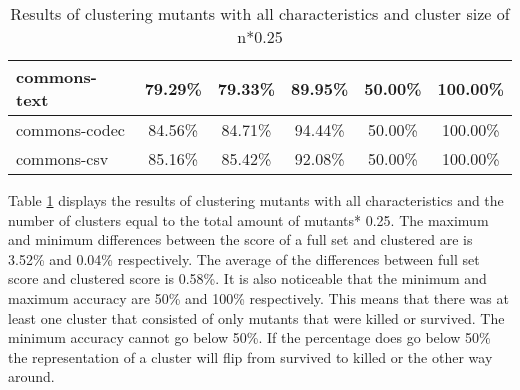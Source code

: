 \documentclass[../../main]{subfiles}
\begin{document}
\begin{table}[!htb]
\begin{tabular}{|l|c|c|c|c|c|}
commons-text                  & 79.29\%                                                                                 & 79.33\%                                                                                     & 89.95\%                                                                              & 50.00\%                                                                               & 100.00\%                                                                             \\ \hline
commons-codec                 & 84.56\%                                                                                 & 84.71\%                                                                                     & 94.44\%                                                                              & 50.00\%                                                                               & 100.00\%                                                                             \\ \hline
commons-csv                   & 85.16\%                                                                                 & 85.42\%                                                                                     & 92.08\%                                                                              & 50.00\%                                                                               & 100.00\%                                                                             \\ \hline

\end{tabular}
\caption{\label{tab:clustering_all_25}Results of clustering mutants with all characteristics and cluster size of n*0.25}
\end{table}
\FloatBarrier

Table \ref{tab:clustering_all_25} displays the results of clustering mutants with all characteristics and the number of clusters equal to the total amount of mutants* 0.25.  
The maximum and minimum differences between the score of a full set and clustered are is 3.52\% and 0.04\% respectively.  
The average of the differences between full set score and clustered score is 0.58\%.
It is also noticeable that the minimum and maximum accuracy are 50\% and 100\% respectively.
This means that there was at least one cluster that consisted of only mutants that were killed or survived.
The minimum accuracy cannot go below 50\%.
If the percentage does go below 50\% the representation of a cluster will flip from survived to killed or the other way around.
\end{document}
